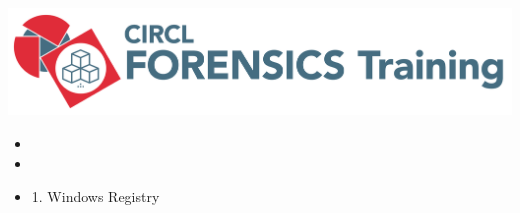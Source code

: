 %
%



\begin{frame}
    \includegraphics[scale=.3]{images/logo-circl-Forensics.png}
    \begin{itemize}
        \item[]
        \item[]
        \item[] 1. Windows Registry
    \end{itemize}
\end{frame}


